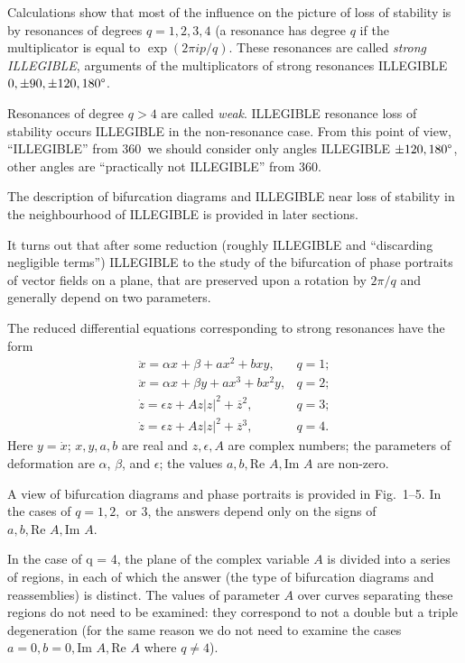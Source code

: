 \documentclass[12pt]{amsart}
\begin{document}
Calculations show that most of the influence on the picture of loss of stability
is by resonances of degrees $q=1,2,3,4$ (a resonance has degree $q$ if the
multiplicator is equal to $\exp(2\pi ip/q)$.
These resonances are called \textit{strong ILLEGIBLE}, arguments of the
multiplicators of strong resonances ILLEGIBLE $0,\pm90,\pm120,180\degree$.

Resonances of degree $q>4$ are called \textit{weak}.
ILLEGIBLE resonance loss of stability occurs ILLEGIBLE in the non-resonance
case.
From this point of view, ``ILLEGIBLE'' from 360\degree~we should consider only
angles ILLEGIBLE $\pm120,180\degree$, other angles are ``practically not
ILLEGIBLE'' from 360\degree.

The description of bifurcation diagrams and ILLEGIBLE near loss of stability in
the neighbourhood of ILLEGIBLE is provided in later sections.

It turns out that after some reduction (roughly ILLEGIBLE and ``discarding
negligible terms'') ILLEGIBLE to the study of the bifurcation of phase portraits
of vector fields on a plane, that are preserved upon a rotation by $2\pi/q$
and generally depend on two parameters.

The reduced differential equations corresponding to strong resonances have the
form
$$\begin{array}{ll}
\ddot x=\alpha x+\beta+ax^2+bxy,&q=1;\\
\ddot x=\alpha x+\beta y+ax^3+bx^2y,&q=2;\\
\dot z=\epsilon z+Az|z|^2+\overline z^2,&q=3;\\
\dot z=\epsilon z+Az|z|^2+\overline z^3,&q=4.
\end{array}$$
Here $y=\dot x$; $x,y,a,b$ are real and $z,\epsilon,A$ are complex numbers;
the parameters of deformation are $\alpha$, $\beta$, and $\epsilon$; the values
$a,b,\text{Re }A,\text{Im }A$ are non-zero.

A view of bifurcation diagrams and phase portraits is provided in Fig.~1--5.
In the cases of $q=1,2,$ or $3$, the answers depend only on the signs of
$a,b,\text{Re }A,\text{Im }A$.

In the case of q = 4, the plane of the complex variable $A$ is divided into a
series of regions, in each of which the answer (the type of bifurcation diagrams
and reassemblies) is distinct.
The values of parameter $A$ over curves separating these regions do not need to
be examined: they correspond to not a double but a triple degeneration (for the
same reason we do not need to examine the cases
$a=0,b=0,\text{Im }A,\text{Re }A$ where $q\neq4$).
\end{document}
